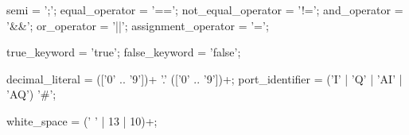 semi = ';';
equal_operator = '==';
not_equal_operator = '!=';
and_operator = '&&';
or_operator = '||';
assignment_operator = '=';

true_keyword = 'true';
false_keyword = 'false';

decimal_literal = (['0' .. '9'])+ '.' (['0' .. '9'])+;
port_identifier = ('I' | 'Q' | 'AI' | 'AQ') '#';

white_space = (' ' | 13 | 10)+;